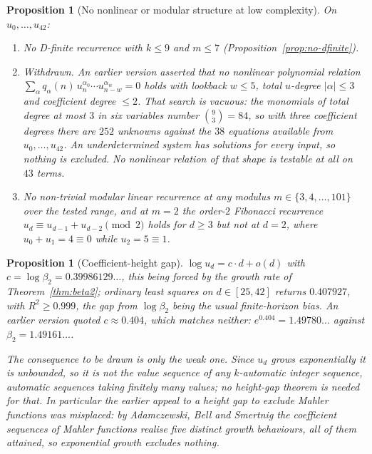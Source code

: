 \documentclass[11pt]{article}
\theoremstyle{plain}
\newtheorem{proposition}[theorem]{Proposition}
\theoremstyle{definition}
\theoremstyle{remark}
\begin{document}
\begin{proposition}[No nonlinear or modular structure at low complexity]
\label{prop:no-recurrence-strong}
On $u_0, \ldots, u_{42}$:
\begin{enumerate}
\item[\textnormal{(i)}] No D-finite recurrence with $k \le 9$ and
$m \le 7$ (Proposition~\ref{prop:no-dfinite}).
\item[\textnormal{(ii)}] \emph{Withdrawn.} An earlier version asserted
that no nonlinear polynomial relation
$\sum_\alpha q_\alpha(n)\,u_n^{\alpha_0}\cdots u_{n-w}^{\alpha_w} = 0$
holds with lookback $w \le 5$, total $u$-degree $|\alpha| \le 3$ and
coefficient degree $\le 2$. That search is vacuous: the monomials of
total degree at most $3$ in six variables number
$\binom{9}{3} = 84$, so with three coefficient degrees there are $252$
unknowns against the $38$ equations available from
$u_0,\ldots,u_{42}$. An underdetermined system has solutions for every
input, so nothing is excluded. No nonlinear relation of that shape is
testable at all on $43$ terms.
\item[\textnormal{(iii)}] No non-trivial modular linear recurrence at
any modulus $m \in \{3, 4, \ldots, 101\}$ over the tested range, and at
$m = 2$ the order-$2$ Fibonacci recurrence
$u_d \equiv u_{d-1} + u_{d-2} \pmod 2$ holds for $d \ge 3$ but
\emph{not} at $d = 2$, where $u_0 + u_1 = 4 \equiv 0$ while
$u_2 = 5 \equiv 1$.
\end{enumerate}
\end{proposition}

\begin{proposition}[Coefficient-height gap]
\label{prop:height-gap}
$\log u_d = c \cdot d + o(d)$ with $c = \log \beta_2 = 0.39986129\ldots$,
this being forced by the growth rate of Theorem~\ref{thm:beta2};
ordinary least squares on $d \in [25,42]$ returns $0.407927$, with
$R^2 \ge 0.999$, the gap from $\log\beta_2$ being the usual finite-horizon
bias. An earlier version quoted $c \approx 0.404$, which matches neither:
$e^{0.404} = 1.49780\ldots$ against $\beta_2 = 1.49161\ldots$.

The consequence to be drawn is only the weak one. Since $u_d$ grows
exponentially it is unbounded, so it is not the value sequence of any
$k$-automatic integer sequence, automatic sequences taking finitely many
values; no height-gap theorem is needed for that. In particular the
earlier appeal to a height gap to exclude Mahler functions was
misplaced: by Adamczewski, Bell and Smertnig \cite{ABS} the coefficient sequences of
Mahler functions realise five distinct growth behaviours, all of them
attained, so exponential growth excludes nothing.
\end{proposition}
\end{document}
